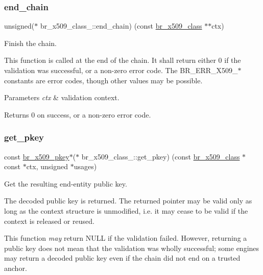 \subsubsection{\texorpdfstring{end\+\_\+chain}{end\_chain}}
{\footnotesize\ttfamily unsigned($\ast$ br\+\_\+x509\+\_\+class\+\_\+\+::end\+\_\+chain) (const \hyperlink{bearssl__x509_8h_acf3af5c1ad4007b178e4c6d68ce5bb0d}{br\+\_\+x509\+\_\+class} $\ast$$\ast$ctx)}



Finish the chain. 

This function is called at the end of the chain. It shall return either 0 if the validation was successful, or a non-\/zero error code. The {\ttfamily B\+R\+\_\+\+E\+R\+R\+\_\+\+X509\+\_\+$\ast$} constants are error codes, though other values may be possible.


\begin{DoxyParams}{Parameters}
{\em ctx} & validation context. \\
\hline
\end{DoxyParams}
\begin{DoxyReturn}{Returns}
0 on success, or a non-\/zero error code. 
\end{DoxyReturn}
\mbox{\label{structbr__x509__class___a307c5d22b156e8affd3f7f3f0b7f87ba}} 
\subsubsection{\texorpdfstring{get\+\_\+pkey}{get\_pkey}}
{\footnotesize\ttfamily const \hyperlink{structbr__x509__pkey}{br\+\_\+x509\+\_\+pkey}$\ast$($\ast$ br\+\_\+x509\+\_\+class\+\_\+\+::get\+\_\+pkey) (const \hyperlink{bearssl__x509_8h_acf3af5c1ad4007b178e4c6d68ce5bb0d}{br\+\_\+x509\+\_\+class} $\ast$const $\ast$ctx, unsigned $\ast$usages)}



Get the resulting end-\/entity public key. 

The decoded public key is returned. The returned pointer may be valid only as long as the context structure is unmodified, i.\+e. it may cease to be valid if the context is released or reused.

This function {\itshape may} return {\ttfamily N\+U\+LL} if the validation failed. However, returning a public key does not mean that the validation was wholly successful; some engines may return a decoded public key even if the chain did not end on a trusted anchor.

